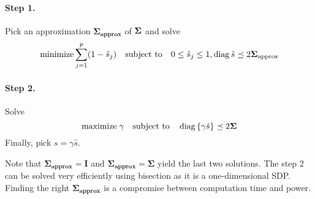 \paragraph*{Step 1.}
Pick an approximation $\mathbf{\Sigma_\text{approx}}$ of $\bm{\Sigma}$ and solve
\[
    \text{minimize} \sum_{j = 1}^p (1 - \hat{s}_j)
    \quad\text{subject to}\quad
    0 \leq \hat{s}_j \leq 1, \operatorname*{diag}{\hat{s}} \preceq 2\mathbf{\Sigma_\text{approx}}
\]
\paragraph*{Step 2.}
Solve
\[
    \text{maximize}\;\gamma
    \quad\text{subject to}\quad
    \operatorname*{diag}\left\{\gamma\hat{s}\right\} \preceq 2\mathbf{\Sigma}
\]
Finally, pick $s = \gamma \hat{s}$.

Note that $\mathbf{\Sigma_\text{approx}} = \mathbf{I}$ and $\mathbf{\Sigma_\text{approx}} = \mathbf{\Sigma}$ yield
the last two solutions.
The step 2 can be solved very efficiently using bisection as it is a one-dimensional SDP\@.
Finding the right  $\mathbf{\Sigma_\text{approx}}$ is a compromise between computation time and power.
